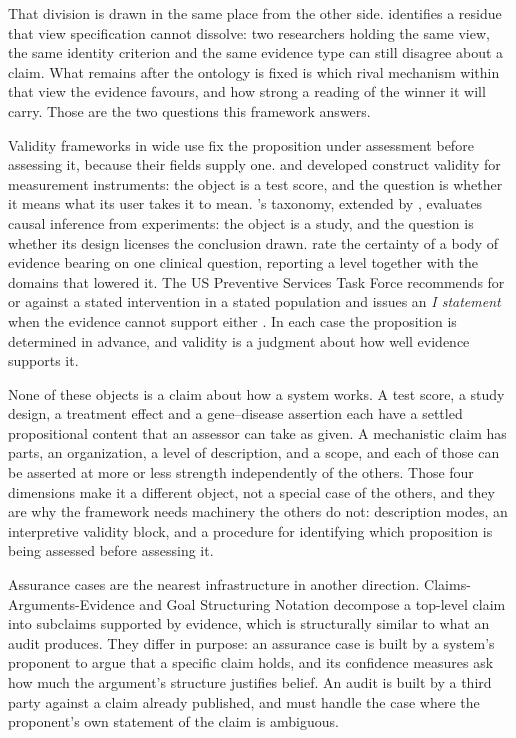 \documentclass{article}
\begin{document}
That division is drawn in the same place from the other side. \citeauthor{tower2026mechviews} identifies a residue that view specification cannot dissolve: two researchers holding the same view, the same identity criterion and the same evidence type can still disagree about a claim. What remains after the ontology is fixed is which rival mechanism within that view the evidence favours, and how strong a reading of the winner it will carry. Those are the two questions this framework answers.

Validity frameworks in wide use fix the proposition under assessment before assessing it, because their fields supply one. \citet{cronbach1955construct} and \citet{messick1995validity} developed construct validity for measurement instruments: the object is a test score, and the question is whether it means what its user takes it to mean. \citeauthor{campbell1963experimental}'s taxonomy, extended by \citet{shadish2002experimental}, evaluates causal inference from experiments: the object is a study, and the question is whether its design licenses the conclusion drawn. \citet{guyatt2008grade} rate the certainty of a body of evidence bearing on one clinical question, reporting a level together with the domains that lowered it. The US Preventive Services Task Force recommends for or against a stated intervention in a stated population and issues an \emph{I statement} when the evidence cannot support either \citep{uspstf2021}. In each case the proposition is determined in advance, and validity is a judgment about how well evidence supports it.

None of these objects is a claim about how a system works. A test score, a study design, a treatment effect and a gene--disease assertion each have a settled propositional content that an assessor can take as given. A mechanistic claim has parts, an organization, a level of description, and a scope, and each of those can be asserted at more or less strength independently of the others. Those four dimensions make it a different object, not a special case of the others, and they are why the framework needs machinery the others do not: description modes, an interpretive validity block, and a procedure for identifying which proposition is being assessed before assessing it.

Assurance cases are the nearest infrastructure in another direction. Claims-Arguments-Evidence and Goal Structuring Notation decompose a top-level claim into subclaims supported by evidence, which is structurally similar to what an audit produces. They differ in purpose: an assurance case is built by a system's proponent to argue that a specific claim holds, and its confidence measures ask how much the argument's structure justifies belief. An audit is built by a third party against a claim already published, and must handle the case where the proponent's own statement of the claim is ambiguous.
\end{document}
